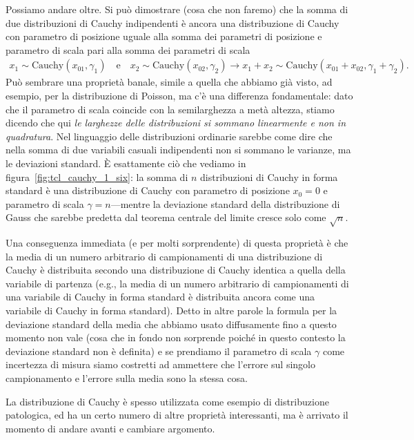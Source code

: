 Possiamo andare oltre. Si può dimostrare (cosa che non faremo) che la somma
di due distribuzioni di Cauchy indipendenti è ancora una distribuzione di
Cauchy con parametro di posizione uguale alla somma dei parametri di posizione
e parametro di scala pari alla somma dei parametri di scala
\begin{align}
  x_1 \sim \text{Cauchy}(x_{01}, \gamma_1) \quad \text{e} \quad
  x_2 \sim \text{Cauchy}(x_{02}, \gamma_2) \rightarrow
  x_1 + x_2 \sim \text{Cauchy}(x_{01} + x_{02}, \gamma_1 + \gamma_2).
\end{align}
Può sembrare una proprietà banale, simile a quella che abbiamo già visto,
ad esempio, per la distribuzione di Poisson, ma c'è una differenza
fondamentale: dato che il parametro di scala coincide con la semilarghezza a
metà altezza, stiamo dicendo che qui \emph{le larghezze delle distribuzioni
  si sommano linearmente e non in quadratura}. Nel linguaggio delle
distribuzioni ordinarie sarebbe come dire che nella somma di due variabili
casuali indipendenti non si sommano le varianze, ma le deviazioni standard.
\`E esattamente ciò che vediamo in figura~\ref{fig:tcl_cauchy_1_six}: la
somma di $n$ distribuzioni di Cauchy in forma standard è una distribuzione
di Cauchy con parametro di posizione $x_0 = 0$ e parametro di scala
$\gamma = n$---mentre la deviazione standard della distribuzione di Gauss che
sarebbe predetta dal teorema centrale del limite cresce solo come $\sqrt{n}$.

Una conseguenza immediata (e per molti sorprendente) di questa proprietà
è che la media di un numero arbitrario di campionamenti di una distribuzione
di Cauchy è distribuita secondo una distribuzione di Cauchy identica a quella
della variabile di partenza (e.g., la media di un numero arbitrario di
campionamenti di una variabile di Cauchy in forma standard è distribuita
ancora come una variabile di Cauchy in forma standard). Detto in altre parole
la formula per la deviazione standard della media che abbiamo usato diffusamente
fino a questo momento non vale (cosa che in fondo non sorprende poiché in
questo contesto la deviazione standard non è definita) e se prendiamo
il parametro di scala $\gamma$ come incertezza di misura siamo costretti ad
ammettere che l'errore sul singolo campionamento e l'errore sulla media sono
la stessa cosa.

La distribuzione di Cauchy è spesso utilizzata come esempio di distribuzione
patologica, ed ha un certo numero di altre proprietà interessanti, ma è
arrivato il momento di andare avanti e cambiare argomento.


